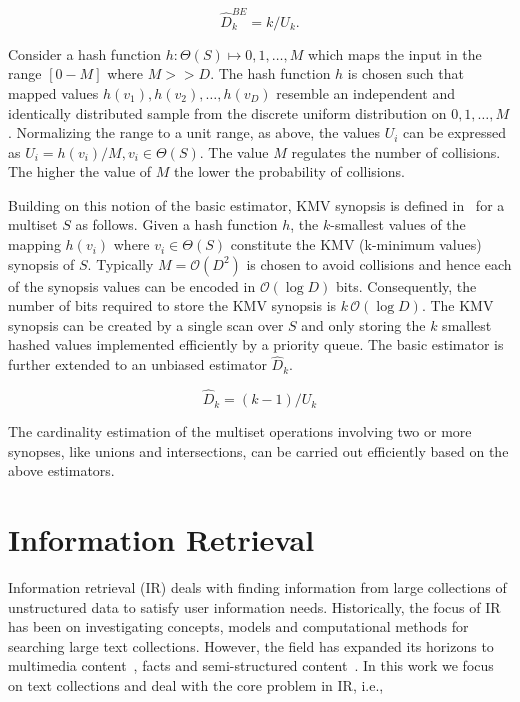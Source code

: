 \begin{equation*}
\label{eq:basicestimator}
\hat{D}^{BE}_{k}=k  / U_{k}.
\end{equation*}
 
 Consider a hash function $h: \Theta(S) \mapsto {0,1, \dots,M}$ which maps the input in the range $[0-M]$ where $M >> D$. The hash function $h$ is chosen such that mapped values $h(v_1),h(v_2), \dots,h(v_D)$ resemble an independent and identically distributed sample from the discrete uniform distribution on ${0,1, \dots,M}$. Normalizing the range to a unit range, as above, the values $U_i$ can be expressed as $U_i = h(v_i)/M, v_i \in \Theta(S)$. The value $M$ regulates the number of collisions. The higher the value of $M$ the lower the probability of collisions.

Building on this notion of the basic estimator, KMV synopsis is defined in~\cite{kmv:sigmod} for a multiset $S$ as follows. Given a hash function $h$, the $k$-smallest values of the mapping $h(v_i)$ where $v_i \in \Theta(S)$ constitute the KMV (k-minimum values) synopsis of $S$. Typically $M = \mathcal{O}(D^2)$ is chosen to avoid collisions and hence each of the synopsis values can be encoded in $\mathcal{O}(\log{D})$ bits. Consequently, the number of bits required to store the KMV synopsis is $k\, \mathcal{O}(\log{D})$. The KMV synopsis can be created by a single scan over $S$ and only storing the $k$ smallest hashed values implemented efficiently by a priority queue. The basic estimator is further extended to an unbiased estimator $\hat{D}_{k}$.

\begin{equation*}
\label{eq:kmvestimator}
\hat{D}_{k}=(k-1) / U_{k}
\end{equation*}

The cardinality estimation of the multiset operations involving two or more synopses, like unions and intersections, can be carried out efficiently based on the above estimators. 


\section{Information Retrieval}
\label{sec:ir}

Information retrieval (IR) deals with finding information from large collections of unstructured data to satisfy user information needs. Historically, the focus of IR has been on investigating concepts, models and computational methods for searching large text collections. However, the field has expanded its horizons to multimedia content~\cite{chowdhury2010introduction}, facts and semi-structured content~\cite{lalmas201225, croft2010search}. In this work we focus on text collections and deal with the core problem in IR, i.e.,

